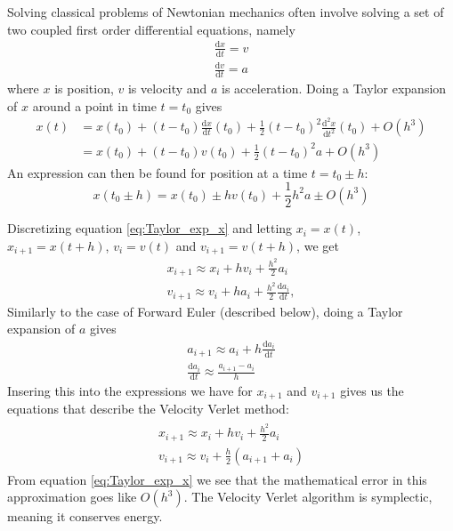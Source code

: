 \documentclass[reprint, english,notitlepage,nofootinbib]{revtex4-1}  %
\begin{document}
Solving classical problems of Newtonian mechanics often involve solving a set of two coupled first order differential equations, namely
\begin{align*}
  \frac{\mathrm d x}{\mathrm dt} = v \\
  \frac{\mathrm d v}{\mathrm dt} = a
\end{align*}
where $x$ is position, $v$ is velocity and $a$ is acceleration. Doing a Taylor expansion of $x$ around a point in time $t = t_0$ gives
\begin{align*}
  x(t) &= x(t_0) + (t - t_0) \frac{\mathrm d x}{\mathrm dt}(t_0) + \frac{1}{2} (t - t_0)^2 \frac{\mathrm d^2 x}{\mathrm dt^2}(t_0) + O(h^3) \\
  &= x(t_0) + (t - t_0) v(t_0) + \frac{1}{2} (t - t_0)^2 a + O(h^3)
\end{align*}
An expression can then be found for position at a time $t = t_0 \pm h$:
\begin{equation}
  \label{eq:Taylor_exp_x}
  x(t_0 \pm h) = x(t_0) \pm h v(t_0) + \frac{1}{2} h^2 a \pm O(h^3)
\end{equation}

Discretizing equation \eqref{eq:Taylor_exp_x} and letting $x_i = x(t)$, $x_{i+1} = x(t + h)$, $v_i = v(t)$ and $v_{i+1} = v(t + h)$, we get
\begin{align*}
  x_{i+1} \approx x_i + h v_i + \frac{h^2}{2} a_i \\
  v_{i+1} \approx v_i + h a_i + \frac{h^2}{2} \frac{\mathrm d a_i}{\mathrm d t},
\end{align*}
Similarly to the case of Forward Euler (described below), doing a Taylor expansion of $a$ gives
\begin{align*}
  a_{i+1} \approx a_i + h \frac{\mathrm d a_i}{\mathrm d t} \\
  \frac{\mathrm d a_i}{\mathrm d t} \approx \frac{a_{i+1} - a_i}{h}
\end{align*}
Insering this into the expressions we have for $x_{i+1}$ and $v_{i+1}$ gives us the equations that describe the Velocity Verlet method:
\begin{align}
\begin{split}
\label{eq:euler}
  x_{i+1} \approx x_i + h v_i + \frac{h^2}{2} a_i \\
  v_{i+1} \approx v_i + \frac{h}{2} (a_{i+1} + a_i)
\end{split}
\end{align}
From equation \eqref{eq:Taylor_exp_x} we see that the mathematical error in this approximation goes like $O(h^3)$. The Velocity Verlet algorithm is symplectic, meaning it conserves energy.
\end{document}
